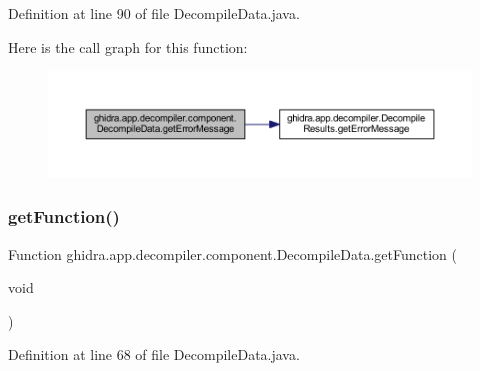 Definition at line 90 of file Decompile\+Data.\+java.

Here is the call graph for this function\+:
\nopagebreak
\begin{figure}[H]
\begin{center}
\leavevmode
\includegraphics[width=350pt]{classghidra_1_1app_1_1decompiler_1_1component_1_1_decompile_data_a4aeb6c97052990e46d6fbe2ed6794a57_cgraph}
\end{center}
\end{figure}
\mbox{\label{classghidra_1_1app_1_1decompiler_1_1component_1_1_decompile_data_a344a21308e8c0e6343e89093be319ac9}} 
\subsubsection{\texorpdfstring{getFunction()}{getFunction()}}
{\footnotesize\ttfamily Function ghidra.\+app.\+decompiler.\+component.\+Decompile\+Data.\+get\+Function (\begin{DoxyParamCaption}\item[{void}]{ }\end{DoxyParamCaption})\hspace{0.3cm}{\ttfamily [inline]}}



Definition at line 68 of file Decompile\+Data.\+java.

